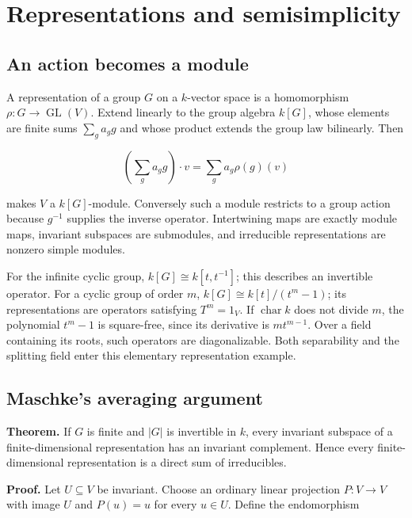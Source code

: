 \documentclass[
  11pt,
]{article}
\begin{document}
\section{Representations and
semisimplicity}\label{representations-and-semisimplicity}

\subsection{An action becomes a
module}\label{an-action-becomes-a-module}

A representation of a group \(G\) on a \(k\)-vector space is a
homomorphism \(\rho:G\to\operatorname{GL}(V)\). Extend linearly to the
group algebra \(k[G]\), whose elements are finite sums \(\sum_g a_g g\)
and whose product extends the group law bilinearly. Then

\[\left(\sum_g a_g g\right)\cdot v=\sum_g a_g\rho(g)(v)\]

makes \(V\) a \(k[G]\)-module. Conversely such a module restricts to a
group action because \(g^{-1}\) supplies the inverse operator.
Intertwining maps are exactly module maps, invariant subspaces are
submodules, and irreducible representations are nonzero simple modules.

For the infinite cyclic group, \(k[G]\cong k[t,t^{-1}]\); this describes
an invertible operator. For a cyclic group of order \(m\),
\(k[G]\cong k[t]/(t^m-1)\); its representations are operators satisfying
\(T^m=1_V\). If \(\operatorname{char}k\) does not divide \(m\), the
polynomial \(t^m-1\) is square-free, since its derivative is
\(mt^{m-1}\). Over a field containing its roots, such operators are
diagonalizable. Both separability and the splitting field enter this
elementary representation example.

\subsection{Maschke's averaging
argument}\label{maschkes-averaging-argument}

\textbf{Theorem.} If \(G\) is finite and \(|G|\) is invertible in \(k\),
every invariant subspace of a finite-dimensional representation has an
invariant complement. Hence every finite-dimensional representation is a
direct sum of irreducibles.

\textbf{Proof.} Let \(U\subseteq V\) be invariant. Choose an ordinary
linear projection \(P:V\to V\) with image \(U\) and \(P(u)=u\) for every
\(u\in U\). Define the endomorphism
\end{document}
